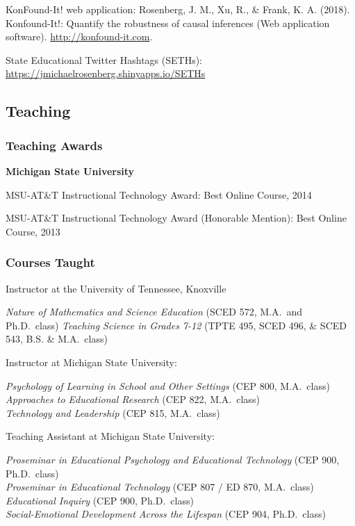 \documentclass[]{article}
\begin{document}
KonFound-It! web application: Rosenberg, J. M., Xu, R., \& Frank, K. A.
(2018). Konfound-It!: Quantify the robustness of causal inferences (Web
application software). \url{http://konfound-it.com}.

State Educational Twitter Hashtags (SETHs):
\href{https://jmichaelrosenberg.shinyapps.io/SETHs/}{https://jmichaelrosenberg.shinyapps.io/SETHs}

\subsection{Teaching}\label{teaching}

\subsubsection{Teaching Awards}\label{teaching-awards}

\textbf{Michigan State University}

MSU-AT\&T Instructional Technology Award: Best Online Course, 2014

MSU-AT\&T Instructional Technology Award (Honorable Mention): Best
Online Course, 2013

\subsubsection{Courses Taught}\label{courses-taught}

Instructor at the University of Tennessee, Knoxville

\emph{Nature of Mathematics and Science Education} (SCED 572, M.A.~and
Ph.D.~class) \emph{Teaching Science in Grades 7-12} (TPTE 495, SCED 496,
\& SCED 543, B.S. \& M.A.~class)

Instructor at Michigan State University:

\emph{Psychology of Learning in School and Other Settings} (CEP 800,
M.A.~class)\\
\emph{Approaches to Educational Research} (CEP 822, M.A.~class)\\
\emph{Technology and Leadership} (CEP 815, M.A.~class)

Teaching Assistant at Michigan State University:

\emph{Proseminar in Educational Psychology and Educational Technology}
(CEP 900, Ph.D.~class)\\
\emph{Proseminar in Educational Technology} (CEP 807 / ED 870,
M.A.~class)\\
\emph{Educational Inquiry} (CEP 900, Ph.D.~class)\\
\emph{Social-Emotional Development Across the Lifespan} (CEP 904,
Ph.D.~class)
\end{document}
